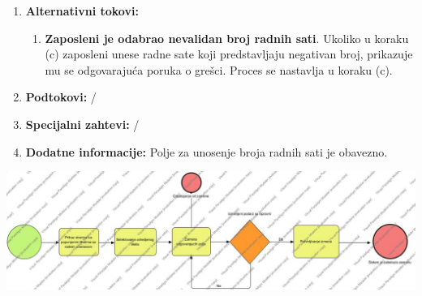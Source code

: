 \documentclass[a4paper]{article}
\begin{document}
\begin{enumerate}
    \item \textbf{Alternativni tokovi:}
        \begin{enumerate}
            \item \textbf{Zaposleni je odabrao nevalidan broj radnih sati}. Ukoliko u koraku (c) zaposleni unese radne sate koji predstavljaju negativan broj, prikazuje mu se odgovarajuća poruka o grešci. Proces se nastavlja u koraku (c).
        \end{enumerate}
    \item \textbf{Podtokovi:} /
    \item \textbf{Specijalni zahtevi:} /
    \item \textbf{Dodatne informacije:} Polje za unosenje broja radnih sati je obavezno.
\end{enumerate}


\includegraphics[scale=0.5]{IzmenaTiketa.jpg}
\end{document}
